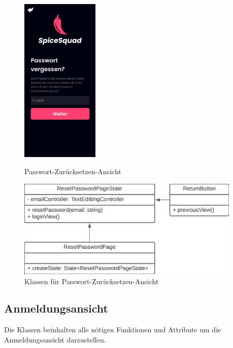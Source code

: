 \documentclass[parskip=full]{scrartcl}
\begin{document}
            \begin{figure}[htp]
                \begin{minipage}
                    [t]{0.49\textwidth}
                    \centering
                    \includegraphics[height=80mm]{images/Presentation-layer/PasswordResetView.jpg}
                    \caption{Passwort-Zurücksetzen-Ansicht}
                \end{minipage}
                \begin{minipage}
                    [t]{0.49\textwidth}
                    \centering
                    \includegraphics[width=0.95\textwidth]{images/Presentation-layer/PasswordResetViewClass.png}
                    \caption{Klassen für Passwort-Zurücksetzen-Ansicht}
                \end{minipage}
            \end{figure}    
        
            \newpage

\subsection{Anmeldungsansicht}
    Die Klassen beinhalten alle nötigen Funktionen und Attribute um die Anmeldungsansicht darzustellen.
\end{document}
